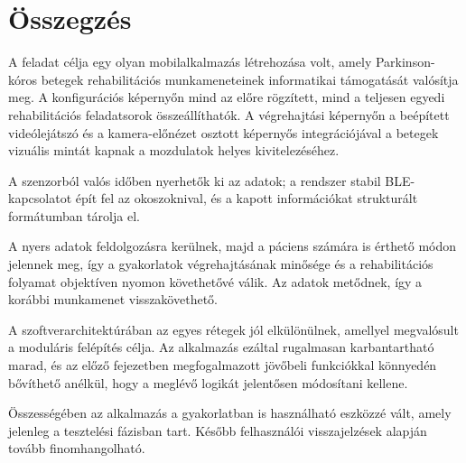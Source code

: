 \section{Összegzés}

A feladat célja egy olyan mobilalkalmazás létrehozása volt, amely Parkinson-kóros
betegek rehabilitációs munkameneteinek informatikai támogatását valósítja meg.
A konfigurációs képernyőn mind az előre rögzített,
mind a teljesen egyedi rehabilitációs feladatsorok összeállíthatók. A végrehajtási képernyőn a
beépített videólejátszó és a kamera-előnézet osztott képernyős integrációjával a betegek vizuális mintát
kapnak a mozdulatok helyes kivitelezéséhez.

A szenzorból valós időben nyerhetők ki az adatok; a rendszer stabil BLE-kapcsolatot épít fel az
okoszoknival, és a kapott információkat strukturált formátumban tárolja el.

A nyers adatok feldolgozásra kerülnek, majd a páciens számára is érthető módon jelennek meg,
így a gyakorlatok végrehajtásának minősége és a rehabilitációs folyamat objektíven nyomon
követhetővé válik. Az adatok metődnek, így a korábbi munkamenet visszakövethető.

A szoftverarchitektúrában az egyes rétegek jól elkülönülnek, amellyel megvalósult a moduláris felépítés
célja. Az alkalmazás ezáltal rugalmasan karbantartható marad, és az előző fejezetben megfogalmazott
jövőbeli funkciókkal könnyedén bővíthető anélkül, hogy a meglévő logikát jelentősen módosítani kellene.

Összességében az alkalmazás a gyakorlatban is használható eszközzé vált,
amely jelenleg a tesztelési fázisban tart. Később felhasználói visszajelzések alapján
tovább finomhangolható.